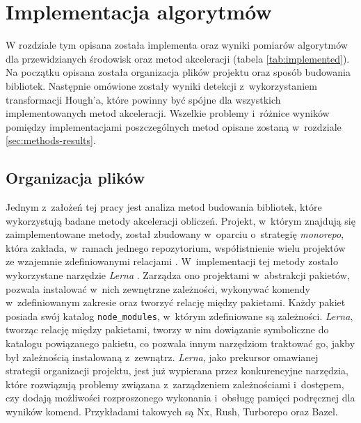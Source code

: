 \chapter{Implementacja algorytmów}
\label{sec:implementation}

W rozdziale tym opisana została implementa oraz wyniki pomiarów algorytmów dla przewidzianych środowisk oraz metod akceleracji (tabela \ref{tab:implemented}). Na początku opisana została organizacja plików projektu oraz sposób budowania bibliotek. Następnie omówione zostały wyniki detekcji z~wykorzystaniem transformacji Hough'a, które powinny być spójne dla wszystkich implementowanych metod akceleracji. Wszelkie problemy i~różnice wyników pomiędzy implementacjami poszczególnych metod opisane zostaną w~rozdziale \ref{sec:methods-results}. 



\section{Organizacja plików}

Jednym z~założeń tej pracy jest analiza metod budowania bibliotek, które wykorzystują badane metody akceleracji obliczeń. Projekt, w~którym znajdują się zaimplementowane metody, został zbudowany w~oparciu o~strategię \textit{monorepo}, która zakłada, w~ramach jednego repozytorium, współistnienie wielu projektów ze wzajemnie zdefiniowanymi relacjami \cite{monorepo}. W~implementacji tej metody zostało wykorzystane narzędzie \textit{Lerna} \cite{lerna}. Zarządza ono projektami w~abstrakcji pakietów, pozwala instalować w~nich zewnętrzne zależności, wykonywać komendy w~zdefiniowanym zakresie oraz tworzyć relację między pakietami. Każdy pakiet posiada swój katalog \lstinline{node_modules}, w~którym zdefiniowane są zależności. \textit{Lerna}, tworząc relację między pakietami, tworzy w nim dowiązanie symboliczne do katalogu powiązanego pakietu, co pozwala innym narzędziom traktować go, jakby był zależnością instalowaną z~zewnątrz. \textit{Lerna}, jako prekursor omawianej strategii organizacji projektu, jest już wypierana przez konkurencyjne narzędzia, które rozwiązują problemy związana z~zarządzeniem zależnościami i~dostępem, czy dodają możliwości rozproszonego wykonania i~obsługę pamięci podręcznej dla wyników komend. Przykładami takowych są Nx, Rush, Turborepo oraz Bazel.

